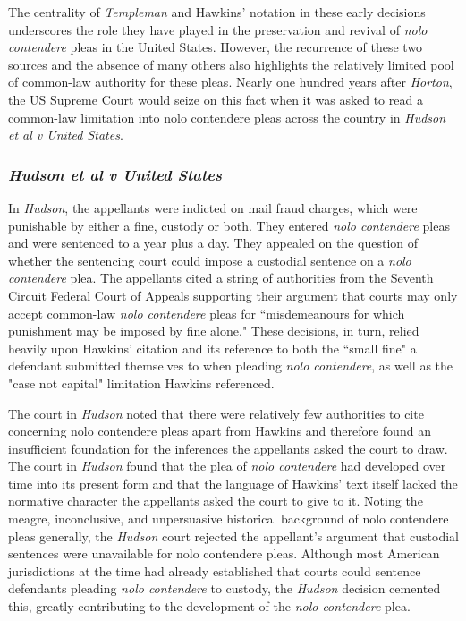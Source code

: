 The centrality of \textit{Templeman} and Hawkins' notation in these early decisions underscores the role they have played in the preservation and revival of \textit{nolo contendere} pleas in the United States. However, the recurrence of these two sources and the absence of many others also highlights the relatively limited pool of common-law authority for these pleas. Nearly one hundred years after \textit{Horton}, the US Supreme Court would seize on this fact when it was asked to read a common-law limitation into nolo contendere pleas across the country in \textit{Hudson et al v United States}.

\subsubsection{\textit{Hudson et al v United States}}
In \textit{Hudson}, the appellants were indicted on mail fraud charges, which were punishable by either a fine, custody or both. They entered \textit{nolo contendere} pleas and were sentenced to a year plus a day. They appealed on the question of whether the sentencing court could impose a custodial sentence on a \textit{nolo contendere} plea. The appellants cited a string of authorities from the Seventh Circuit Federal Court of Appeals supporting their argument that courts may only accept common-law \textit{nolo contendere} pleas for ``misdemeanours for which punishment may be imposed by fine alone." These decisions, in turn, relied heavily upon Hawkins' citation and its reference to both the ``small fine" a defendant submitted themselves to when pleading \textit{nolo contendere}, as well as the "case not capital" limitation Hawkins referenced.

The court in \textit{Hudson} noted that there were relatively few authorities to cite concerning nolo contendere pleas apart from Hawkins and therefore found an insufficient foundation for the inferences the appellants asked the court to draw. The court in \textit{Hudson} found that the plea of \textit{nolo contendere} had developed over time into its present form and that the language of Hawkins' text itself lacked the normative character the appellants asked the court to give to it. Noting the meagre, inconclusive, and unpersuasive historical background of nolo contendere pleas generally, the \textit{Hudson} court rejected the appellant's argument that custodial sentences were unavailable for nolo contendere pleas. Although most American jurisdictions at the time had already established that courts could sentence defendants pleading \textit{nolo contendere} to custody, the \textit{Hudson} decision cemented this, greatly contributing to the development of the \textit{nolo contendere} plea.


